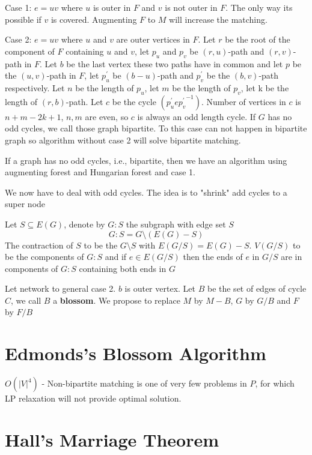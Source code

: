 				Case 1: $e=uv$ where $u$ is outer in $F$ and $v$ is not outer in $F$. The only way its possible if $v$ is covered. Augmenting $F$ to $M$ will increase the matching. 

				Case 2: $e=uv$ where $u$ and $v$ are outer vertices in $F$. Let $r$ be the root of the component of $F$ containing $u$ and $v$, let $p_u$ and $p_v$ be $(r,u)$-path and $(r, v)$-path in $F$. Let $b$ be the last vertex these two paths have in common and let $p$ be the $(u, v)$-path in $F$, let $p_u^\prime$ be $(b-u)$-path and $p_v^\prime$ be the $(b,v)$-path respectively. Let $n$ be the length of $p_u$, let $m$ be the length of $p_v$, let k be the length of $(r, b)$-path. Let $c$ be the cycle $(p_u^\prime e {p_v^{\prime}}^{-1})$. Number of vertices in $c$ is $n + m-2k + 1$, $n, m$ are even, so $c$ is always an odd length cycle. If $G$ has no odd cycles, we call those graph bipartite. To this case can not happen in bipartite graph so algorithm without case 2 will solve bipartite matching.

				If a graph has no odd cycles, i.e., bipartite, then we have an algorithm using augmenting forest and Hungarian forest and case 1.

				We now have to deal with odd cycles. The idea is to "shrink" add cycles to a super node

				Let $S\subseteq E(G)$, denote by $G: S$ the subgraph with edge set $S$
				\begin{equation}
					G:S = G\setminus (E(G)-S)
				\end{equation}
				The contraction of $S$ to be the $G\setminus S$ with $E(G / S) = E(G) - S$. $V(G/S)$ to be the components of $G:S$ and if $e\in E(G/S)$ then the ends of $e$ in $G/S$ are in components of $G:S$ containing both ends in $G$

				Let network to general case 2. $b$ is outer vertex. Let $B$ be the set of edges of cycle $C$, we call $B$ a \textbf{blossom}. We propose to replace $M$ by $M - B$, $G$ by $G/B$ and $F$ by $F/B$

			\section{Edmonds's Blossom Algorithm}


				$O(|V|^4)$
				- Non-bipartite matching is one of very few problems in $P$, for which LP relaxation will not provide optimal solution.

			\section{Hall's Marriage Theorem}

